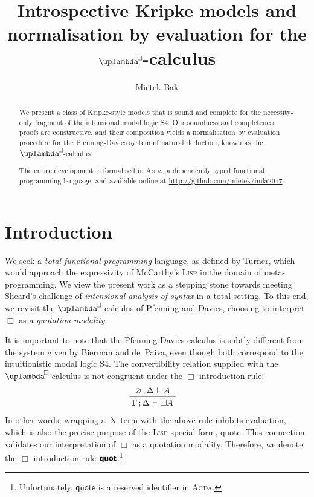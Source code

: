 \documentclass[submission,copyright,creativecommons,sharealike,backref=page]{eptcs}
\title{Introspective Kripke models and\\
       normalisation by evaluation for the $\uplambdabox$-calculus}
\author{Mi{\"e}tek Bak
\email{\textrm{\normalsize{\href{mailto:mietek@bak.io}{mietek@bak.io}}}}}
\newcommand{\uplambdabox}{\uplambda^{\mkern-3mu\Box\mkern-3mu}}
\newcommand{\sA}{\mkern-2muA}
\renewcommand{\:}{\mathop{\mkern3mu:\mkern3mu}}
\renewcommand{\.}{\mathop{\mkern3mu.\mkern3mu}}
\renewcommand{\;}{\mathop{;}}
\renewcommand{\,}{\mathop{,}}
\newcommand{\e}{\mathrel{\mkern2mu\vdash\mkern1mu}}
\newcommand{\quot}{\operatorname{\textsf{\textbf{quot}}}}
\renewcommand{\O}{\varnothing}
\theoremstyle{mystyle}
\begin{document}
\maketitle

\begin{abstract}
We present a class of Kripke-style models that is sound and complete for the necessity-only fragment of the intensional modal logic S4.  Our soundness and completeness proofs are constructive, and their composition yields a normalisation by evaluation procedure for the Pfenning-Davies system of natural deduction, known as the $\uplambdabox$-calculus.

The entire development is formalised in \textsc{Agda}, a dependently typed functional programming language, and available online at \href{http://github.com/mietek/imla2017}{http://github.com/mietek/imla2017}.
\end{abstract}


\section*{Introduction}

We seek a \emph{total functional programming} language, as defined by Turner\cite{Turner04}, which would approach the expressivity of McCarthy's\cite{McCarthyAEHL62} \textsc{Lisp} in the domain of meta-programming.  We view the present work as a stepping stone towards meeting Sheard's\cite{Sheard01} challenge of \emph{intensional analysis of syntax} in a total setting.  To this end, we revisit the $\uplambdabox$-calculus of Pfenning and Davies\cite{PfenningD01}, choosing to interpret $\Box$ as a \emph{quotation modality}.

It is important to note that the Pfenning-Davies calculus is subtly different from the system given by Bierman and de~Paiva\cite{BiermanP00}, even though both correspond to the intuitionistic modal logic S4.  The convertibility relation supplied with the $\uplambdabox$-calculus is not congruent under the $\Box$-introduction rule:
\begin{align*}
  & \prftree
     {\O \; \Delta \e \sA}
     {\Gamma \; \Delta \e \Box A}
\end{align*}
In other words, wrapping a $\uplambda$-term with the above rule inhibits evaluation, which is also the precise purpose of the \textsc{Lisp} special form, \textsf{quote}.  This connection validates our interpretation of $\Box$ as a quotation modality.  Therefore, we denote the $\Box$ introduction rule $\quot$.\footnote{Unfortunately, $\textsf{quote}$ is a reserved identifier in \textsc{Agda}.}
\end{document}
